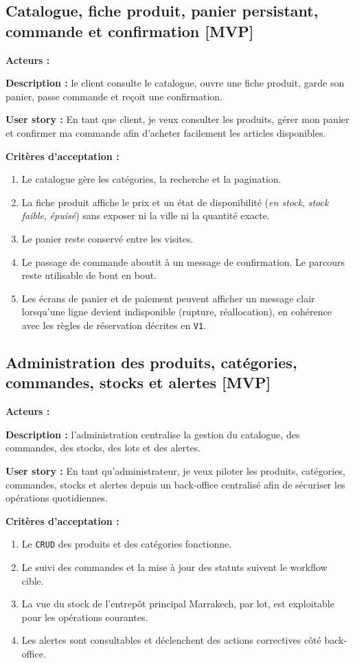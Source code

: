 \documentclass[11pt,a4paper]{scrreprt}
\newcommand{\code}[1]{\texttt{#1}}
\newcommand{\phase}[1]{\textbf{\textcolor{SplinAmber}{#1}}}
\newcommand{\actorbadge}[1]{\highlight{\code{#1}}}
\begin{document}
\subsection{Catalogue, fiche produit, panier persistant, commande et confirmation \phase{[MVP]}}
\textbf{Acteurs :} \actorbadge{CUSTOMER}

\textbf{Description :} le client consulte le catalogue, ouvre une fiche produit, garde son panier, passe commande et reçoit une confirmation.

\textbf{User story :} En tant que client, je veux consulter les produits, gérer mon panier et confirmer ma commande afin d'acheter facilement les articles disponibles.

\textbf{Critères d'acceptation :}
\begin{enumerate}
  \item Le catalogue gère les catégories, la recherche et la pagination.
  \item La fiche produit affiche le prix et un état de disponibilité (\emph{en stock}, \emph{stock faible}, \emph{épuisé}) sans exposer ni la ville ni la quantité exacte.
  \item Le panier reste conservé entre les visites.
  \item Le passage de commande aboutit à un message de confirmation. Le parcours reste utilisable de bout en bout.
  \item Les écrans de panier et de paiement peuvent afficher un message clair lorsqu'une ligne devient indisponible (rupture, réallocation), en cohérence avec les règles de réservation décrites en \code{V1}.
\end{enumerate}

\subsection{Administration des produits, catégories, commandes, stocks et alertes \phase{[MVP]}}
\textbf{Acteurs :} \actorbadge{ADMIN}

\textbf{Description :} l'administration centralise la gestion du catalogue, des commandes, des stocks, des lots et des alertes.

\textbf{User story :} En tant qu'administrateur, je veux piloter les produits, catégories, commandes, stocks et alertes depuis un back-office centralisé afin de sécuriser les opérations quotidiennes.

\textbf{Critères d'acceptation :}
\begin{enumerate}
  \item Le \code{CRUD} des produits et des catégories fonctionne.
  \item Le suivi des commandes et la mise à jour des statuts suivent le workflow cible.
  \item La vue du stock de l'entrepôt principal Marrakech, par lot, est exploitable pour les opérations courantes.
  \item Les alertes sont consultables et déclenchent des actions correctives côté back-office.
\end{enumerate}
\end{document}
